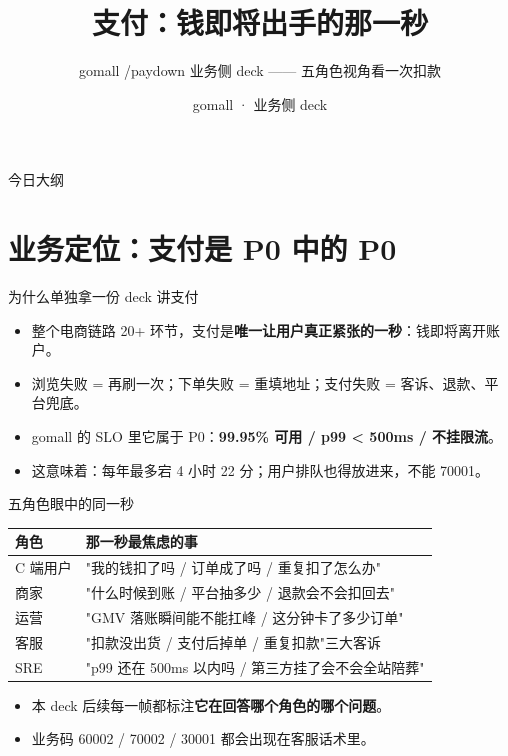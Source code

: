 \documentclass[aspectratio=169,11pt]{beamer}
\title{支付：钱即将出手的那一秒}
\subtitle{gomall /paydown 业务侧 deck —— 五角色视角看一次扣款}
\author{gomall · 业务侧 deck}
\date{}
\begin{document}
\maketitle

\begin{frame}[shrink]{今日大纲}
\tableofcontents
\end{frame}

\section{业务定位：支付是 P0 中的 P0}

\begin{frame}[shrink]{为什么单独拿一份 deck 讲支付}
\begin{itemize}
  \item 整个电商链路 20+ 环节，支付是\textbf{唯一让用户真正紧张的一秒}：钱即将离开账户。
  \item 浏览失败 = 再刷一次；下单失败 = 重填地址；支付失败 = 客诉、退款、平台兜底。
  \item gomall 的 SLO 里它属于 P0：\textbf{99.95\% 可用 / p99 < 500ms / 不挂限流}。
  \item 这意味着：每年最多宕 4 小时 22 分；用户排队也得放进来，不能 70001。
\end{itemize}
\end{frame}

\begin{frame}[shrink]{五角色眼中的同一秒}
\small
\begin{tabular}{@{}lp{8.5cm}@{}}
\toprule
角色 & 那一秒最焦虑的事 \\
\midrule
C 端用户 & "我的钱扣了吗 / 订单成了吗 / 重复扣了怎么办" \\
商家 & "什么时候到账 / 平台抽多少 / 退款会不会扣回去" \\
运营 & "GMV 落账瞬间能不能扛峰 / 这分钟卡了多少订单" \\
客服 & "扣款没出货 / 支付后掉单 / 重复扣款"三大客诉 \\
SRE & "p99 还在 500ms 以内吗 / 第三方挂了会不会全站陪葬" \\
\bottomrule
\end{tabular}
\vspace{2mm}
\begin{itemize}\small
  \item 本 deck 后续每一帧都标注\textbf{它在回答哪个角色的哪个问题}。
  \item 业务码 60002 / 70002 / 30001 都会出现在客服话术里。
\end{itemize}
\end{frame}
\end{document}
